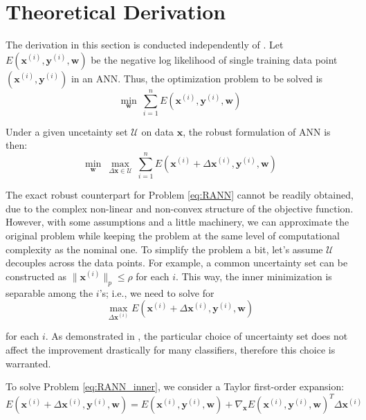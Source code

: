 \documentclass[twoside,12pt]{article}
\newcommand{\M}[1]{\boldsymbol{\mathbf{#1}}}
\newcommand{\Cal}{\mathcal}
\begin{document}
\section{Theoretical Derivation}

The derivation in this section is conducted independently of \cite{shaham2015understanding}. 
Let $E(\M x^{(i)}, \M y^{(i)}, \M w)$ be the negative log likelihood of single training data point $( \M x^{(i)}, \M y^{(i)} )$ in an ANN. Thus, the optimization problem to be solved is
\begin{equation}
\min_{\M w} ~ \sum_{i=1}^n E(\M x^{(i)}, \M y^{(i)}, \M w)
\end{equation}

Under a given uncetainty set $\Cal U$ on data $\M x$, the robust formulation of ANN is then:
\begin{equation}\label{eq:RANN}
\min_{\M w} ~ \max_{\Delta \M x \in \Cal U}~  \sum_{i=1}^n E(\M x^{(i)} + \Delta \M x^{(i)}, \M y^{(i)}, \M w)
\end{equation}

The exact robust counterpart for Problem \eqref{eq:RANN} cannot be readily obtained, due to the complex non-linear and non-convex structure of the objective function. However, with some assumptions and a little machinery, we can approximate the original problem while keeping the problem at the same level of computational complexity as the nominal one. To simplify the problem a bit, let's assume $\Cal U$ decouples across the data points. For example, a common uncertainty set can be constructed as $\| \M x^{(i)} \|_p \leq \rho$ for each $i$. This way, the inner minimization is separable among the $i$'s; i.e., we need to solve for 
\begin{equation}\label{eq:RANN_inner}
\max_{\Delta \M x^{(i)}}  E(\M x^{(i)} + \Delta \M x^{(i)}, \M y^{(i)}, \M w)
\end{equation}

for each $i$. As demonstrated in \cite{bertsimas2015robust}, the particular choice of uncertainty set does not affect the improvement drastically for many classifiers, therefore this choice is warranted.

To solve Problem \eqref{eq:RANN_inner}, we consider a Taylor first-order expansion:
\begin{equation}\label{eq:RANN_taylor}
E(\M x^{(i)} + \Delta \M x^{(i)}, \M y^{(i)}, \M w) = E(\M x^{(i)}, \M y^{(i)}, \M w) + \nabla_{\M x} E(\M x^{(i)}, \M y^{(i)}, \M w) ^T \Delta \M x^{(i)}
\end{equation}
\end{document}
